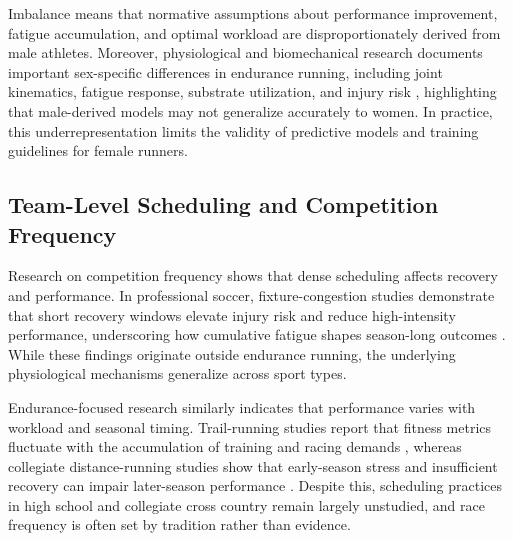\documentclass[suppldata]{interact}
\theoremstyle{plain}%
\theoremstyle{definition}
\theoremstyle{remark}
\begin{document}
Imbalance means that normative assumptions about performance improvement, fatigue accumulation, and optimal workload are disproportionately derived from male athletes. Moreover, physiological and biomechanical research documents important sex-specific differences in endurance running, including joint kinematics, fatigue response, substrate utilization, and injury risk \cite{besson2022sex,xie2022sex,hunter2023biological}, highlighting that male-derived models may not generalize accurately to women. In practice, this underrepresentation limits the validity of predictive models and training guidelines for female runners.

\subsection{Team-Level Scheduling and Competition Frequency}

Research on competition frequency shows that dense scheduling affects recovery and performance. In professional soccer, fixture-congestion studies demonstrate that short recovery windows elevate injury risk and reduce high-intensity performance, underscoring how cumulative fatigue shapes season-long outcomes \cite{page2023effects,howle2020injury}. While these findings originate outside endurance running, the underlying physiological mechanisms generalize across sport types.

Endurance-focused research similarly indicates that performance varies with workload and seasonal timing. Trail-running studies report that fitness metrics fluctuate with the accumulation of training and racing demands \cite{matos2021variations}, whereas collegiate distance-running studies show that early-season stress and insufficient recovery can impair later-season performance \cite{lundstrom2025pre}. Despite this, scheduling practices in high school and collegiate cross country remain largely unstudied, and race frequency is often set by tradition rather than evidence.
\end{document}
